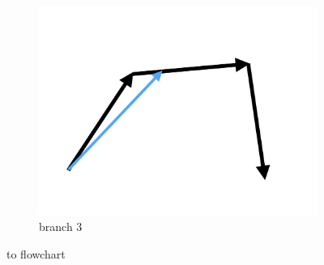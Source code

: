 \documentclass[12pt]{article}
\begin{document}
\begin{mySection}[Algorithm]
\begin{figure}
\begin{subfigure}{0.3\linewidth}
  		\includegraphics[width=1.0\linewidth]{Flowchart_branch3.pdf}
  		\caption{branch 3}
  		\label{fig:branch3}
  	\end{subfigure}
  	\caption{to flowchart}
	\label{fig:flowchart_branch}
\end{figure}

\end{mySection}
\end{document}
